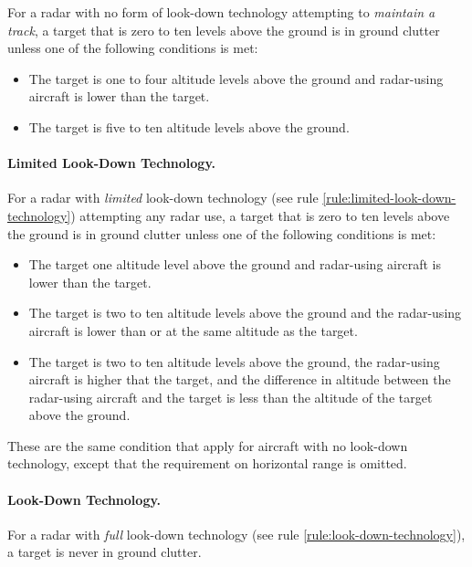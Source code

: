 {\begin{itemize}
    \end{itemize}

For a radar with no form of look-down technology attempting to \emph{maintain a track}, a target that is zero to ten levels above the ground is in ground clutter unless one of the following conditions is met:
 

    \begin{itemize}

        \item The target is one to four altitude levels above the ground and radar-using aircraft is lower than the target.
        
        \item The target is five to ten altitude levels above the ground.
        
    \end{itemize}

\paragraph{Limited Look-Down Technology.} For a radar with \emph{limited} look-down technology (see rule \ref{rule:limited-look-down-technology}) attempting any radar use, a target that is zero to ten levels above the ground is in ground clutter unless one of the following conditions is met:

    \begin{itemize}

        \item The target one altitude level above the ground and radar-using aircraft is lower than the target.

        \item The target is two to ten altitude levels above the ground and the radar-using aircraft is lower than or at the same altitude as the target.

        \item The target is two to ten altitude levels above the ground, the radar-using aircraft is higher that the target, and the difference in altitude between the radar-using aircraft and the target is less than the altitude of the target above the ground.

    \end{itemize}
    
These are the same condition that apply for aircraft with no look-down technology, except that the requirement on horizontal range is omitted.

\paragraph{Look-Down Technology.} For a radar with \emph{full} look-down technology (see rule \ref{rule:look-down-technology}), a target is never in ground clutter.

}
